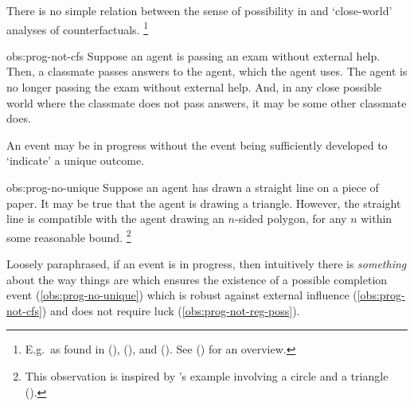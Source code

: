 \begin{note}
  \begin{observation}%
    \label{obs:prog-not-cfs}%
    There is no simple relation between the sense of possibility in \assuPP{} and `close-world' analyses of counterfactuals.%
    \footnote{
      E.g.\ as found in (\cite{Todd:1964aa}), (\cite{Stalnaker:1968vt}), and (\cite{Lewis:1973th}).
      See (\cite[\S2]{Starr:2022aa}) for an overview.
    }
  \end{observation}
  \begin{motivation}{obs:prog-not-cfs}
    Suppose an agent is passing an exam without external help.
    Then, a classmate passes answers to the agent, which the agent uses.
    The agent is no longer passing the exam without external help.
    And, in any close possible world where the classmate does not pass answers, it may be some other classmate does.
  \end{motivation}

  \begin{observation}%
    \label{obs:prog-no-unique}%
    An event may be in progress without the event being sufficiently developed to `indicate' a unique outcome.\newline
  \end{observation}
  \begin{motivation}{obs:prog-no-unique}
    Suppose an agent has drawn a straight line on a piece of paper.
    It may be true that the agent is drawing a triangle.
    However, the straight line is compatible with the agent drawing an \(n\)-sided polygon, for any \(n\) within some reasonable bound.%
    \footnote{
      This observation is inspired by \citeauthor{Dowty:1979vq}'s example involving a circle and a triangle (\citeyear[133]{Dowty:1979vq}).
    }
  \end{motivation}

  \noindent%
  Loosely paraphrased, if an event is in progress, then intuitively there is \emph{something} about the way things are which ensures the existence of a possible completion event (\autoref{obs:prog-no-unique}) which is robust against external influence (\autoref{obs:prog-not-cfs}) and does not require luck (\autoref{obs:prog-not-reg-poss}).
\end{note}


